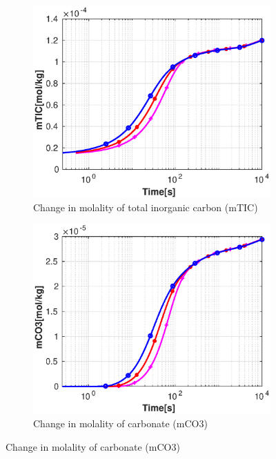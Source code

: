 \begin{figure}[!h]
    \hfill
    \begin{subfigure}{.5\linewidth}
            \centering
        \includegraphics[width=\textwidth]{PICTURES/without_grid_mTIC.eps}
        \caption{Change in molality of total inorganic carbon (mTIC)}
        \label{fig:withoutgridmTIC}
    \end{subfigure}%
    \hfill
    \begin{subfigure}{.5\linewidth}
            \centering
        \includegraphics[width=\textwidth]{PICTURES/without_grid_mCO3.eps}
        \caption{Change in molality of carbonate (mCO3)}
        \label{fig:withoutgridmCO3}

\end{subfigure}
\end{figure}

